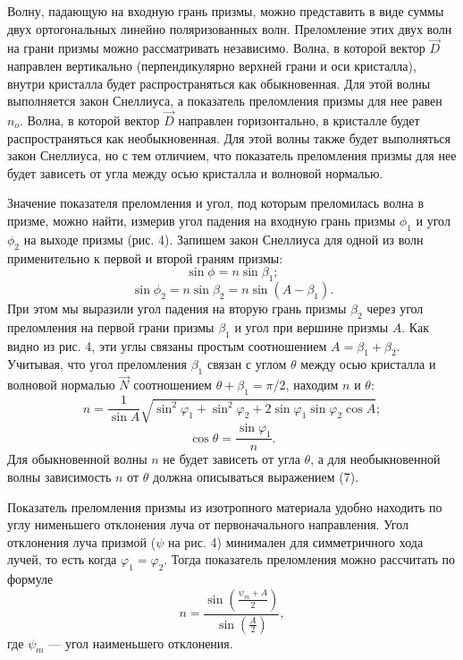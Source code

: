 \documentclass[a4paper, 12pt]{article}%
\begin{document}
Волну, падающую на входную грань призмы, можно представить в виде суммы двух ортогональных линейно поляризованных волн. Преломление этих двух волн на грани призмы можно рассматривать независимо. Волна, в которой вектор $\vec D$ направлен вертикально (перпендикулярно верхней грани и оси кристалла), внутри кристалла будет распространяться как обыкновенная. Для этой волны выполняется закон Снеллиуса, а показатель преломления призмы для нее равен $n_o$. Волна, в которой вектор $\vec D$ направлен горизонтально, в кристалле будет распространяться как необыкновенная. Для этой волны также будет выполняться закон Снеллиуса, но с тем отличием, что показатель преломления призмы для нее будет зависеть от угла между осью кристалла и волновой нормалью. 

Значение показателя преломления и угол, под которым преломилась волна в призме, можно найти, измерив угол падения на входную грань призмы $\phi_1$ и угол $\phi_2$ на выходе призмы (рис. 4). Запишем закон Снеллиуса для одной из волн применительно к первой и второй граням призмы:
\[
	\sin \phi = n \sin \beta_1;
\]
\[
	\sin \phi_2 = n \sin \beta_2 = n \sin (A - \beta_1).
\]
При этом мы выразили угол падения на вторую грань призмы $\beta_2$ через угол преломления на первой грани призмы $\beta_1$ и угол при вершине призмы $A$. Как видно из рис. 4, эти углы связаны простым соотношением $A = \beta_1 + \beta_2$. Учитывая, что угол преломления $\beta_1$ связан с углом $\theta$ между осью кристалла и волновой нормалью $\vec N$ соотношением $\theta + \beta_1 = \pi / 2$, находим $n$ и $\theta$:
\begin{equation}
n = \frac{1}{\sin A} \sqrt{\sin^2 \varphi_1 + \sin^2 \varphi_2 + 2 \sin \varphi_1 \sin \varphi_2 \cos A};
\end{equation}
\[
	\cos \theta = \frac{\sin \varphi_1}{n}.
\]
Для обыкновенной волны $n$ не будет зависеть от угла $\theta$, а для необыкновенной волны зависимость $n$ от $\theta$ должна описываться выражением (7).

Показатель преломления призмы из изотропного материала удобно находить по углу нименьшего отклонения луча от первоначального направления. Угол отклонения луча призмой ($\psi$ на рис. 4) минимален для симметричного хода лучей, то есть когда $\varphi_1 = \varphi_2$. Тогда показатель преломления можно рассчитать по формуле
\begin{equation}
n=\frac{\sin \left(\frac{\psi_{m}+A}{2}\right)}{\sin \left(\frac{A}{2}\right)},
\end{equation}
где $\psi_m$ --- угол наименьшего отклонения.
\end{document}
